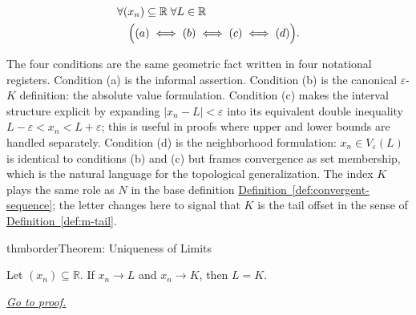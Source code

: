 \begin{remark*}
\[
\begin{aligned}
&\forall (x_n) \subseteq \mathbb{R} \;\forall L \in \mathbb{R}\\
&\quad\Bigl(
    (a) \;\Longleftrightarrow\; (b)
         \;\Longleftrightarrow\; (c)
         \;\Longleftrightarrow\; (d)
\Bigr).
\end{aligned}
\]
\end{remark*}

\begin{remark*}[Interpretation]
The four conditions are the same geometric fact written in four
notational registers. Condition (a) is the informal assertion.
Condition (b) is the canonical $\varepsilon$-$K$ definition: the
absolute value formulation. Condition (c) makes the interval
structure explicit by expanding $|x_n - L| < \varepsilon$ into its
equivalent double inequality $L - \varepsilon < x_n < L +
\varepsilon$; this is useful in proofs where upper and lower bounds
are handled separately. Condition (d) is the neighborhood
formulation: $x_n \in V_\varepsilon(L)$ is identical to conditions
(b) and (c) but frames convergence as set membership, which is the
natural language for the topological generalization. The index $K$
plays the same role as $N$ in the base definition
\hyperref[def:convergent-sequence]{Definition~\ref*{def:convergent-sequence}};
the letter changes here to signal that $K$ is the tail offset in
the sense of \hyperref[def:m-tail]{Definition~\ref*{def:m-tail}}.
\end{remark*}






















\begin{bpnew}{thmborder}{Theorem: Uniqueness of Limits}
\begin{theorem}
\label{thm:uniqueness-of-limits}

Let $(x_n) \subseteq \mathbb{R}$. If $x_n \to L$ and $x_n \to K$, then
$L = K$.

\smallskip
\noindent
\hyperref[prf:uniqueness-of-limits]{\textit{Go to proof.}}
\end{theorem}
\end{bpnew}


